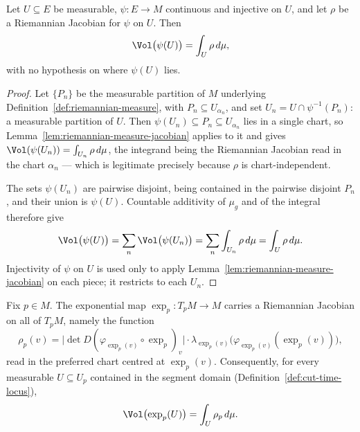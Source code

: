\begin{lemma}
\label{lem:riemannian-measure-jacobian-global}
\leanok



Let $U\subseteq E$ be measurable, $\psi\colon E\to M$ continuous and
injective on $U$, and let $\rho$ be a Riemannian Jacobian for $\psi$ on
$U$. Then
$$\Vol\bigl(\psi(U)\bigr)=\int_U \rho\,d\mu,$$
with no hypothesis on where $\psi(U)$ lies.
\end{lemma}

\begin{proof}
\sketch
{}
\leanok
Let $\{P_n\}$ be the measurable partition of $M$ underlying
Definition~\ref{def:riemannian-measure}, with $P_n\subseteq
U_{\alpha_n}$, and set $U_n=U\cap\psi^{-1}(P_n)$: a measurable
partition of $U$. Then $\psi(U_n)\subseteq P_n\subseteq U_{\alpha_n}$
lies in a single chart, so
Lemma~\ref{lem:riemannian-measure-jacobian} applies to it and gives
$\Vol(\psi(U_n))=\int_{U_n}\rho\,d\mu$, the integrand being the
Riemannian Jacobian read in the chart $\alpha_n$ --- which is
legitimate precisely because $\rho$ is chart-independent.

The sets $\psi(U_n)$ are pairwise disjoint, being contained in the
pairwise disjoint $P_n$, and their union is $\psi(U)$. Countable
additivity of $\mu_g$ and of the integral therefore give
$$\Vol\bigl(\psi(U)\bigr)=\sum_n\Vol\bigl(\psi(U_n)\bigr)
=\sum_n\int_{U_n}\rho\,d\mu=\int_U\rho\,d\mu.$$
Injectivity of $\psi$ on $U$ is used only to apply
Lemma~\ref{lem:riemannian-measure-jacobian} on each piece; it restricts
to each $U_n$.
\end{proof}

\begin{lemma}
\label{lem:exponential-riemannian-jacobian}
\leanok



Fix $p\in M$. The exponential map $\exp_p\colon T_pM\to M$ carries a Riemannian
Jacobian on all of $T_pM$, namely the function
$$\rho_p(v)=\bigl\lvert\det D(\varphi_{\exp_p(v)}\circ\exp_p)_v\bigr\rvert\cdot
  \lambda_{\exp_p(v)}\bigl(\varphi_{\exp_p(v)}(\exp_p(v))\bigr),$$
read in the preferred chart centred at $\exp_p(v)$. Consequently, for every measurable
$U\subseteq U_p$ contained in the segment domain (Definition~\ref{def:cut-time-locus}),
$$\Vol\bigl(\exp_p(U)\bigr)=\int_U\rho_p\,d\mu.$$
\end{lemma}

